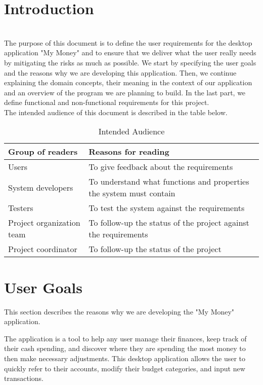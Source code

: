 \documentclass[12pt]{article}
\begin{document}
\section{Introduction} \\
 The purpose of this document is to define the user requirements for the desktop application "My Money" and to ensure that we deliver what the user really needs by mitigating the risks as much as possible. We start by specifying the user goals and the reasons why we are developing this application. Then, we continue explaining the domain concepts, their meaning in the context of our application and an overview of the program we are planning to build. In the last part, we define functional and non-functional requirements for this project.    \\ The intended audience of this document is described in the table below.
\begin{table}[ht]

\begin{center}

\begin{tabular}{| m{5cm} | m{10cm}|}

\hline
\textbf{Group of readers} & \textbf{Reasons for reading} \\
 \hline Users & To give feedback about the requirements \\
\hline System developers & To understand what functions and properties the system must contain \\
\hline Testers & To test the system against the requirements \\
\hline Project organization team & To follow-up the status of the project against the requirements \\
\hline Project coordinator & To follow-up the status of the project \\

\hline
\end{tabular}
\caption{Intended Audience}
\end{center}
\end{table}

\section{User Goals}

This section describes the reasons why we are developing the "My Money" application.

The application is a tool to help any user manage their finances, keep track of their cash spending, and discover where they are spending the most money to then make necessary adjustments.
This desktop application allows the user to quickly refer to their accounts, modify their budget categories, and input new transactions.
\end{document}
